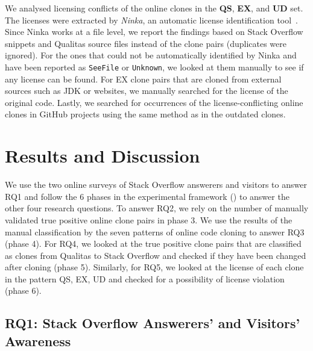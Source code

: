 \documentclass[10pt,journal,compsoc]{IEEEtran}
\begin{document}
We analysed licensing conflicts of the online clones in the \textbf{QS},
\textbf{EX}, and \textbf{UD} set. The licenses were extracted by \emph{Ninka},
an automatic license identification tool~\cite{German2010}. Since Ninka works at
a file level, we report the findings based on Stack Overflow snippets and Qualitas
source files instead of the clone pairs (duplicates were ignored). For the ones
that could not be automatically identified by Ninka and have been reported as
{\small\texttt{SeeFile}} or {\small\texttt{Unknown}}, we looked at them manually
to see if any license can be found. For EX clone pairs that are cloned from
external sources such as JDK or websites, we manually searched for the license
of the original code. Lastly, we searched for occurrences of the license-conflicting
online clones in GitHub projects using the same method as in the outdated clones.

\section{Results and Discussion}

We use the two online surveys of Stack Overflow answerers and visitors to answer RQ1
and follow the 6 phases in the experimental framework
() to answer the other four research questions. To answer RQ2,
we rely on the number of manually validated true positive online clone pairs in
phase 3. We use the results of the manual classification by the seven patterns
of online code cloning to answer RQ3 (phase 4). For RQ4, we looked at the true
positive clone pairs that are classified as clones from Qualitas to Stack
Overflow and checked if they have been changed after cloning (phase 5).
Similarly, for RQ5, we looked at the license of each clone in the pattern QS,
EX, UD and checked for a possibility of license violation (phase 6). 

\subsection{RQ1: Stack Overflow Answerers' and Visitors' Awareness}

\end{document}
